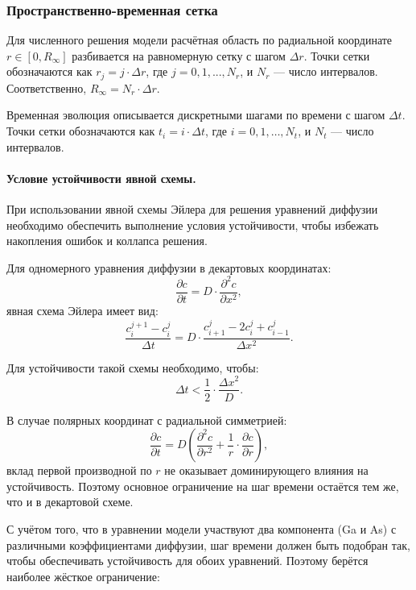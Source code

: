\documentclass[14pt,oneside]{extarticle}
\begin{document}
\subsubsection{Пространственно-временная сетка}

Для численного решения модели расчётная область по радиальной координате \( r \in [0, R_\infty] \) разбивается на равномерную сетку с шагом \( \Delta r \). Точки сетки обозначаются как \( r_j = j \cdot \Delta r \), где \( j = 0, 1, ..., N_r \), и \( N_r \) — число интервалов. Соответственно, \( R_\infty = N_r \cdot \Delta r \).

Временная эволюция описывается дискретными шагами по времени с шагом \( \Delta t \). Точки сетки обозначаются как \( t_{i}=i\cdot\Delta t \), где \( i=0,1,\ldots,N_{t} \), и \( N_t \) — число интервалов. 

\paragraph{Условие устойчивости явной схемы.}

При использовании явной схемы Эйлера для решения уравнений диффузии необходимо обеспечить выполнение условия устойчивости, чтобы избежать накопления ошибок и коллапса решения.

Для одномерного уравнения диффузии в декартовых координатах:
\[
\frac{\partial c}{\partial t} = D \cdot \frac{\partial^2 c}{\partial x^2},
\]
явная схема Эйлера имеет вид:
\[
\frac{c_i^{j+1} - c_i^j}{\Delta t} = D \cdot \frac{c_{i+1}^j - 2c_i^j + c_{i-1}^j}{\Delta x^2}.
\]

Для устойчивости такой схемы необходимо\cite{leveque2007}, чтобы:
\begin{equation}
\Delta t < \frac{1}{2} \cdot \frac{\Delta x^2}{D}.
\label{eq:cfl_classic}
\end{equation}

В случае полярных координат с радиальной симметрией:
\[
\frac{\partial c}{\partial t} = D \left(
\frac{\partial^2 c}{\partial r^2} + \frac{1}{r} \cdot \frac{\partial c}{\partial r}
\right),
\]
вклад первой производной по \( r \) не оказывает доминирующего влияния на устойчивость. Поэтому основное ограничение на шаг времени остаётся тем же, что и в декартовой схеме.

С учётом того, что в уравнении модели участвуют два компонента (Ga и As) с различными коэффициентами диффузии, шаг времени должен быть подобран так, чтобы обеспечивать устойчивость для обоих уравнений. Поэтому берётся наиболее жёсткое ограничение:
\end{document}
